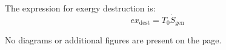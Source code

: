 The expression for exergy destruction is:  
\[
ex_{\text{dest}} = T_0 \dot{S}_{\text{gen}}
\]  

No diagrams or additional figures are present on the page.
